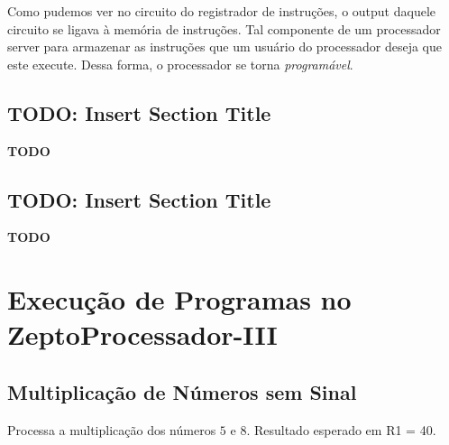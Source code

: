 \documentclass[12pt]{article}
\begin{document}
Como pudemos ver no circuito do registrador de instruções, o output daquele
circuito se ligava à memória de instruções. Tal componente de um processador
server para armazenar as instruções que um usuário do processador deseja que
este execute. Dessa forma, o processador se torna \emph{programável}.

\subsection{\textbf{TODO: Insert Section Title}}\label{sec:2.3}

\textbf{TODO}

\subsection{\textbf{TODO: Insert Section Title}}\label{sec:2.4}

\textbf{TODO}

\section{Execução de Programas no ZeptoProcessador-III}\label{sec:programs}

\subsection{Multiplicação de Números sem Sinal}\label{sec:programs:multu}

Processa a multiplicação dos números $5$ e $8$. Resultado esperado em R1 = 40.
\end{document}
